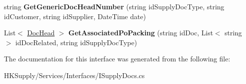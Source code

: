 \begin{DoxyCompactItemize}
string {\bfseries Get\+Generic\+Doc\+Head\+Number} (string id\+Supply\+Doc\+Type, string id\+Customer, string id\+Supplier, Date\+Time date)
\item 
\mbox{\label{interface_h_k_supply_1_1_services_1_1_interfaces_1_1_i_supply_docs_ad69306dba6afdc479bbf39258af1a117}} 
List$<$ \mbox{\hyperlink{class_h_k_supply_1_1_models_1_1_supply_1_1_doc_head}{Doc\+Head}} $>$ {\bfseries Get\+Associated\+Po\+Packing} (string id\+Doc, List$<$ string $>$ id\+Doc\+Related, string id\+Supply\+Doc\+Type)
\end{DoxyCompactItemize}


The documentation for this interface was generated from the following file\+:\begin{DoxyCompactItemize}
\item 
H\+K\+Supply/\+Services/\+Interfaces/I\+Supply\+Docs.\+cs\end{DoxyCompactItemize}
